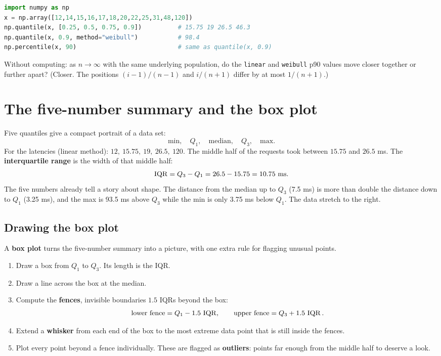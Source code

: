 \begin{lstlisting}[language=Python]
import numpy as np
x = np.array([12,14,15,16,17,18,20,22,25,31,48,120])
np.quantile(x, [0.25, 0.5, 0.75, 0.9])          # 15.75 19 26.5 46.3
np.quantile(x, 0.9, method="weibull")           # 98.4
np.percentile(x, 90)                            # same as quantile(x, 0.9)
\end{lstlisting}

\begin{recoverybox}
Without computing: as $n \to \infty$ with the same underlying population, do the
\texttt{linear} and \texttt{weibull} p90 values move closer together or further apart?
(Closer. The positions $(i-1)/(n-1)$ and $i/(n+1)$ differ by at most $1/(n+1)$.)
\end{recoverybox}

\section{The five-number summary and the box plot}

Five quantiles give a compact portrait of a data set:
\[
  \text{min},\quad Q_1,\quad \text{median},\quad Q_3,\quad \text{max}.
\]
For the latencies (linear method): $12,\ 15.75,\ 19,\ 26.5,\ 120$. The middle half of
the requests took between $15.75$ and $26.5$ ms. The \textbf{interquartile range} is the
width of that middle half:
\[
  \operatorname{IQR} = Q_3 - Q_1 = 26.5 - 15.75 = 10.75 \text{ ms}.
\]
The five numbers already tell a story about shape. The distance from the median up to
$Q_3$ (7.5 ms) is more than double the distance down to $Q_1$ (3.25 ms), and the max is
93.5 ms above $Q_3$ while the min is only 3.75 ms below $Q_1$. The data stretch to
the right.

\subsection{Drawing the box plot}

A \textbf{box plot} turns the five-number summary into a picture, with one extra rule
for flagging unusual points.

\begin{enumerate}
  \item Draw a box from $Q_1$ to $Q_3$. Its length is the IQR.
  \item Draw a line across the box at the median.
  \item Compute the \textbf{fences}, invisible boundaries $1.5$ IQRs beyond the box:
  \[
    \text{lower fence} = Q_1 - 1.5\,\operatorname{IQR}, \qquad \text{upper fence} = Q_3 + 1.5\,\operatorname{IQR}.
  \]
  \item Extend a \textbf{whisker} from each end of the box to the most extreme data
  point that is still inside the fences.
  \item Plot every point beyond a fence individually. These are flagged as
  \textbf{outliers}: points far enough from the middle half to deserve a look.
\end{enumerate}

